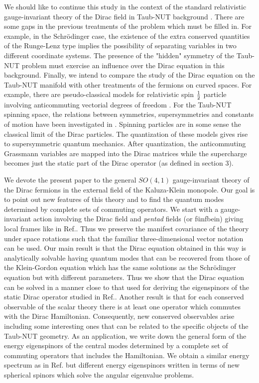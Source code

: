 \documentclass[a4paper,12pt]{article}
\begin{document}
We should like to continue this study in the context of the standard 
relativistic gauge-invariant theory \cite{W,BD} of the Dirac field in 
Taub-NUT background \cite{DIRAC}. There are some gaps in the previous 
treatments of the problem which must be filled in. For example, in the 
Schr\" odinger case, the existence of the extra conserved quantities of 
the Runge-Lenz type implies the possibility of separating variables in 
two different coordinate systems. The presence of the "hidden" symmetry 
of the Taub-NUT problem must exercise an influence over the Dirac 
equation in this background. Finally, we intend to compare the study of 
the Dirac equation on the Taub-NUT manifold with other treatments of 
the fermions on curved spaces. For example, there are pseudo-classical 
models for relativistic spin ${1\over 2}$ particle involving anticommuting 
vectorial degrees of freedom \cite{grass}. For the Taub-NUT spinning 
space, the relations between symmetries, supersymmetries and constants 
of motion have been investigated in \cite{G3}. Spinning particles are in 
some sense the classical limit of the Dirac particles. The quantization of 
these models gives rise to supersymmetric quantum mechanics. After 
quantization, the anticommuting Grassmann variables are mapped into the 
Dirac matrices while the  supercharge becomes just the static part of 
the Dirac operator (as defined in section 3). 


We devote the present paper to the general $SO(4,1)$ gauge-invariant theory 
of the Dirac fermions \cite{DKK} in the external field of the Kaluza-Klein 
monopole\cite{DIRAC}. Our goal is to point out new  features of this theory 
and to find  the quantum modes determined by complete sets of commuting 
operators. We start with a gauge-invariant action involving the Dirac field 
and {\em pentad} fields (or f\" unfbein) giving local frames like in 
Ref.\cite{P}. Thus we  preserve the manifest covariance of the theory under 
space rotations such that the  familiar three-dimensional vector notation can 
be used. Our main result is that the Dirac equation obtained in this way 
\cite{DIRAC} is analytically solvable having quantum modes that can be 
recovered from those of the Klein-Gordon equation which has the same solutions 
as the Schr\" odinger equation \cite{CV} but with different parameters. Thus 
we show that the Dirac equation can be solved in a manner close to that used 
for deriving the eigenspinors of the static Dirac operator studied in 
Ref.\cite{CH}. Another result is that for each conserved observable of the 
scalar theory there is  at least one operator which commutes with the Dirac 
Hamiltonian. Consequently, new conserved observables arise including some 
interesting ones that can be related to the specific objects of the Taub-NUT 
geometry. As an application, we write down the general form of the energy 
eigenspinors of the central modes determined by a complete set of commuting 
operators that includes the Hamiltonian. We obtain a similar energy spectrum 
as in Ref.\cite{CH} but different energy eigenspinors written in terms of new 
spherical spinors which solve the angular eigenvalue problems. 
\end{document}
